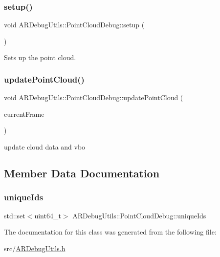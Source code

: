 \subsubsection{\texorpdfstring{setup()}{setup()}}
{\footnotesize\ttfamily void A\+R\+Debug\+Utils\+::\+Point\+Cloud\+Debug\+::setup (\begin{DoxyParamCaption}{ }\end{DoxyParamCaption})\hspace{0.3cm}{\ttfamily [inline]}}



Sets up the point cloud. 

\mbox{\label{class_a_r_debug_utils_1_1_point_cloud_debug_a02a8d4c24ec4b19c238288874a568a9f}} 
\subsubsection{\texorpdfstring{update\+Point\+Cloud()}{updatePointCloud()}}
{\footnotesize\ttfamily void A\+R\+Debug\+Utils\+::\+Point\+Cloud\+Debug\+::update\+Point\+Cloud (\begin{DoxyParamCaption}\item[{A\+R\+Frame $\ast$}]{current\+Frame }\end{DoxyParamCaption})\hspace{0.3cm}{\ttfamily [inline]}}



update cloud data and vbo 



\subsection{Member Data Documentation}
\mbox{\label{class_a_r_debug_utils_1_1_point_cloud_debug_a6405deec8e383af9b59593e7e207d1cf}} 
\subsubsection{\texorpdfstring{unique\+Ids}{uniqueIds}}
{\footnotesize\ttfamily std\+::set$<$uint64\+\_\+t$>$ A\+R\+Debug\+Utils\+::\+Point\+Cloud\+Debug\+::unique\+Ids}



The documentation for this class was generated from the following file\+:\begin{DoxyCompactItemize}
\item 
src/\mbox{\hyperlink{_a_r_debug_utils_8h}{A\+R\+Debug\+Utils.\+h}}\end{DoxyCompactItemize}
